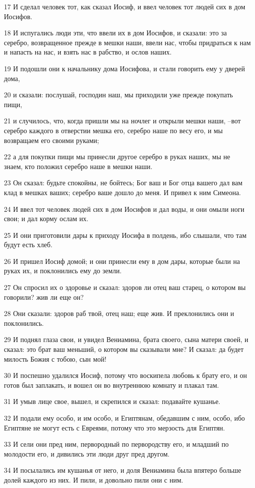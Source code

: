\par 17 И сделал человек тот, как сказал Иосиф, и ввел человек тот людей сих в дом Иосифов.
\par 18 И испугались люди эти, что ввели их в дом Иосифов, и сказали: это за серебро, возвращенное прежде в мешки наши, ввели нас, чтобы придраться к нам и напасть на нас, и взять нас в рабство, и ослов наших.
\par 19 И подошли они к начальнику дома Иосифова, и стали говорить ему у дверей дома,
\par 20 и сказали: послушай, господин наш, мы приходили уже прежде покупать пищи,
\par 21 и случилось, что, когда пришли мы на ночлег и открыли мешки наши, --вот серебро каждого в отверстии мешка его, серебро наше по весу его, и мы возвращаем его своими руками;
\par 22 а для покупки пищи мы принесли другое серебро в руках наших, мы не знаем, кто положил серебро наше в мешки наши.
\par 23 Он сказал: будьте спокойны, не бойтесь; Бог ваш и Бог отца вашего дал вам клад в мешках ваших; серебро ваше дошло до меня. И привел к ним Симеона.
\par 24 И ввел тот человек людей сих в дом Иосифов и дал воды, и они омыли ноги свои; и дал корму ослам их.
\par 25 И они приготовили дары к приходу Иосифа в полдень, ибо слышали, что там будут есть хлеб.
\par 26 И пришел Иосиф домой; и они принесли ему в дом дары, которые были на руках их, и поклонились ему до земли.
\par 27 Он спросил их о здоровье и сказал: здоров ли отец ваш старец, о котором вы говорили? жив ли еще он?
\par 28 Они сказали: здоров раб твой, отец наш; еще жив. И преклонились они и поклонились.
\par 29 И поднял глаза свои, и увидел Вениамина, брата своего, сына матери своей, и сказал: это брат ваш меньший, о котором вы сказывали мне? И сказал: да будет милость Божия с тобою, сын мой!
\par 30 И поспешно удалился Иосиф, потому что воскипела любовь к брату его, и он готов был заплакать, и вошел он во внутреннюю комнату и плакал там.
\par 31 И умыв лице свое, вышел, и скрепился и сказал: подавайте кушанье.
\par 32 И подали ему особо, и им особо, и Египтянам, обедавшим с ним, особо, ибо Египтяне не могут есть с Евреями, потому что это мерзость для Египтян.
\par 33 И сели они пред ним, первородный по первородству его, и младший по молодости его, и дивились эти люди друг пред другом.
\par 34 И посылались им кушанья от него, и доля Вениамина была впятеро больше долей каждого из них. И пили, и довольно пили они с ним.

